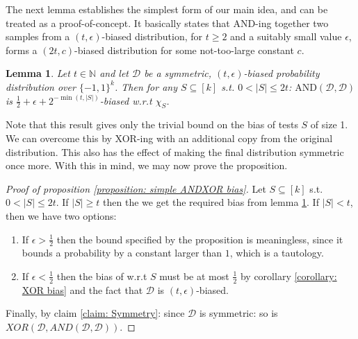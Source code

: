 \documentclass[12pt]{article}
\newtheorem{lemma}[theorem]{Lemma}
\newcommand{\oo}[1]{\{-1,1\}^{#1}}
\newcommand{\dist}{\mathcal{D}}
\newcommand{\AND}{\mathrm{AND} }
\newcommand{\abs}[1]{\left| #1 \right|}
\begin{document}
	The next lemma establishes the simplest form of our main idea, and can be treated as a proof-of-concept.
	It basically states that AND-ing together two samples from a $(t,\epsilon)$-biased distribution, for $t \geq 2$ and a suitably small value $\epsilon$, forms a $(2t,c)$-biased distribution for some not-too-large constant $c$.
	
	\begin{lemma} \label{lemma: AND test enhancement}
		Let $t \in \mathbb{N}$ and let $\dist$ be a symmetric, $(t,\epsilon)$-biased probability distribution over $\oo{k}$.
		Then for any $S \subseteq \left[k\right]$ s.t. $0 < \abs{S} \leq 2t$:
		$\AND(\dist,\dist)$ is $\frac{1}{2} + \epsilon + 2^{-\min(t, \abs{S})}$-biased w.r.t $\chi_S$.
	\end{lemma}
	
	Note that this result gives only the trivial bound on the bias of tests $S$ of size 1.
	We can overcome this by XOR-ing with an additional copy from the original distribution.
	This also has the effect of making the final distribution symmetric once more.
	With this in mind, we may now prove the proposition.
	
	\begin{proof}[Proof of proposition \ref{proposition: simple ANDXOR bias}]
		Let $S \subseteq \left[k\right]$ s.t. $0 < \abs{S} \leq 2t$.
		If $\abs{S} \geq t$ then the we get the required bias from lemma \ref{lemma: AND test enhancement}.
		If $\abs{S} < t$, then we have two options:
		\begin{enumerate}
			\item If $\epsilon > \frac{1}{2}$ then the bound specified by the proposition is meaningless, since it bounds a probability by a constant larger than $1$, which is a tautology.
			\item If $\epsilon < \frac{1}{2}$ then the bias of w.r.t $S$ must be at most $\frac{1}{2}$ by corollary \ref{corollary: XOR bias} and the fact that $\dist$ is $(t, \epsilon)$-biased.
		\end{enumerate}
		Finally, by claim \ref{claim: Symmetry}: since $\dist$ is symmetric: so is $XOR(\dist, AND(\dist, \dist))$.
	\end{proof}
	
\end{document}
